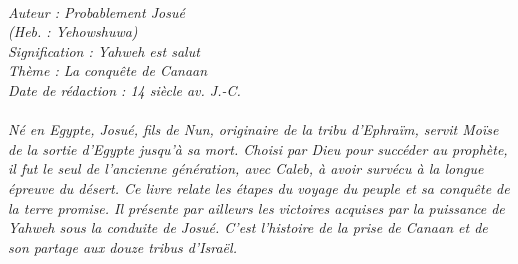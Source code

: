\BFont
\noindent\hrulefill
{\footnotesize
\textit{
\bigskip
{\centering{}
\\Auteur : Probablement Josué
\\(Heb. : Yehowshuwa)
\\Signification : Yahweh est salut
\\Thème : La conquête de Canaan
\\Date de rédaction : 14 siècle av. J.-C.\\}
}
\textit{
\\Né en Egypte, Josué, fils de Nun, originaire de la tribu d'Ephraïm, servit Moïse de la sortie d'Egypte jusqu'à sa mort. Choisi par Dieu pour succéder au prophète, il fut le seul de l'ancienne génération, avec Caleb, à avoir survécu à la longue épreuve du désert. Ce livre relate les étapes du voyage du peuple et sa conquête de la terre promise. Il présente par ailleurs les victoires acquises par la puissance de Yahweh sous la conduite de Josué. C'est l'histoire de la prise de Canaan et de son partage aux douze tribus d'Israël.\bigskip
}
}
\par\nobreak\noindent\hrulefill
